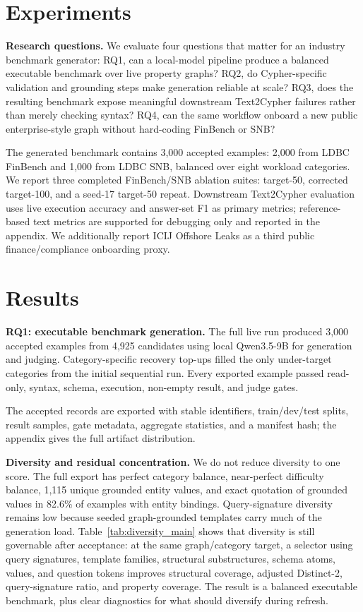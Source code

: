 \documentclass[11pt]{article}
\begin{document}
\section{Experiments}
\noindent\textbf{Research questions.} We evaluate four questions that matter for an industry benchmark generator: RQ1, can a local-model pipeline produce a balanced executable benchmark over live property graphs? RQ2, do Cypher-specific validation and grounding steps make generation reliable at scale? RQ3, does the resulting benchmark expose meaningful downstream Text2Cypher failures rather than merely checking syntax? RQ4, can the same workflow onboard a new public enterprise-style graph without hard-coding FinBench or SNB?

The generated benchmark contains 3,000 accepted examples: 2,000 from LDBC FinBench and 1,000 from LDBC SNB, balanced over eight workload categories. We report three completed FinBench/SNB ablation suites: target-50, corrected target-100, and a seed-17 target-50 repeat. Downstream Text2Cypher evaluation uses live execution accuracy and answer-set F1 as primary metrics; reference-based text metrics are supported for debugging only and reported in the appendix. We additionally report ICIJ Offshore Leaks as a third public finance/compliance onboarding proxy.

\section{Results}
\noindent\textbf{RQ1: executable benchmark generation.} The full live run produced 3,000 accepted examples from 4,925 candidates using local Qwen3.5-9B for generation and judging. Category-specific recovery top-ups filled the only under-target categories from the initial sequential run. Every exported example passed read-only, syntax, schema, execution, non-empty result, and judge gates.



The accepted records are exported with stable identifiers, train/dev/test splits, result samples, gate metadata, aggregate statistics, and a manifest hash; the appendix gives the full artifact distribution.

\noindent\textbf{Diversity and residual concentration.} We do not reduce diversity to one score. The full export has perfect category balance, near-perfect difficulty balance, 1,115 unique grounded entity values, and exact quotation of grounded values in 82.6\% of examples with entity bindings. Query-signature diversity remains low because seeded graph-grounded templates carry much of the generation load. Table~\ref{tab:diversity_main} shows that diversity is still governable after acceptance: at the same graph/category target, a selector using query signatures, template families, structural substructures, schema atoms, values, and question tokens improves structural coverage, adjusted Distinct-2, query-signature ratio, and property coverage. The result is a balanced executable benchmark, plus clear diagnostics for what should diversify during refresh.
\end{document}
